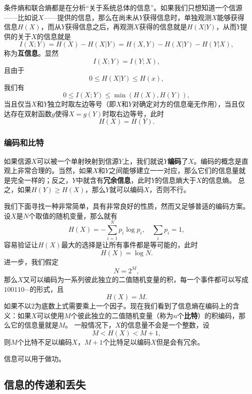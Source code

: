 \documentclass[UTF8, a4paper]{ctexart}
\begin{document}
条件熵和联合熵都是在分析“关于系统总体的信息”。如果我们只想知道一个信源——比如说$X$——提供的信息，那么在尚未从$Y$获得信息时，单独观测$X$能够获得信息$H(X)$，而从$Y$获得信息之后，再观测$X$获得的信息就是$H(X|Y)$，从而$Y$提供的关于$X$的信息就是
\begin{equation}
    I(X;Y) = H(X) - H(X|Y) = H(X, Y) - H(X|Y) - H(Y|X),
\end{equation}
称为\textbf{互信息}。显然
\begin{equation}
    I(X;Y) = I(Y;X),
\end{equation}
且由于
\[
    0 \leq H(X|Y) \leq H(x),
\]
我们有
\begin{equation}
    0 \leq I(X;Y) \leq \min(H(X), H(Y)),
\end{equation}
当且仅当$X$和$Y$独立时取左边等号（即$X$和$Y$对确定对方的信息毫无作用），当且仅达存在双射函数$g$使得$X=g(Y)$时取右边等号，此时
\[
    H(X) = H(Y).
\]

\subsubsection{编码和比特}

如果信源$X$可以被一个单射映射到信源$Y$上，我们就说$Y$\textbf{编码}了$X$。编码的概念是直观上非常合理的。当然，如果$X$和$Y$之间能够建立一一对应，那么它们的信息量就是完全一样的；反之，$Y$中就含有\textbf{冗余信息}，此时$Y$的信息熵大于$X$的信息熵。
总之，如果$H(Y) \geq H(X)$，那么$Y$就可以编码$X$，否则不行。

我们下面寻找一种非常简单，具有非常良好的性质，然而又足够普适的编码方案。设$X$是$N$个取值的随机变量，那么就有
\[
    H(X) = - \sum_{i=1}^N p_i \log p_i, \quad \sum_i p_i = 1,
\]
容易验证让$H(X)$最大的选择是让所有事件都是等可能的，此时
\begin{equation}
    H(X) = \log N.
\end{equation}
进一步，我们假定
\[
    N = 2^M,
\]
那么$X$又可以编码为一系列彼此独立的二值随机变量的积，每一个事件都可以写成$100110\cdots$的形式，且
\[
    H(X) = M.
\]
如果不以$2$为底数上式需要乘上一个因子。现在我们看到了信息熵在编码上的含义：如果$X$可以使用$M$个彼此独立的二值随机变量（称为$n$个\textbf{比特}）的积编码，那么它的信息量就是$M$。
一般情况下，$X$的信息量不会是一个整数，设
\[
    M < H(X) < M+1,
\]
则$M$个比特不足以编码$X$，$M+1$个比特足以编码$X$但是会有冗余。

信息可以用于做功。

\subsection{信息的传递和丢失}
\end{document}
